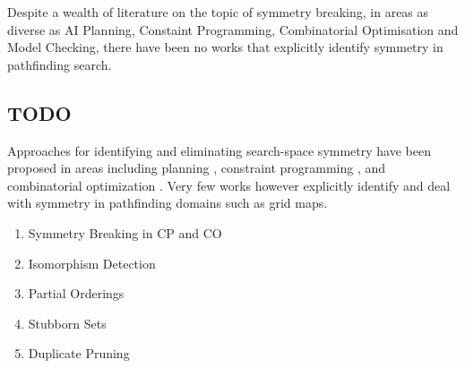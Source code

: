 Despite a wealth of literature on the topic of symmetry breaking, in areas
as diverse as AI Planning, Constaint Programming, Combinatorial Optimisation
and Model Checking, there have been no works that explicitly identify symmetry 
in pathfinding search.

\subsection{TODO}
Approaches for identifying and eliminating search-space symmetry have been
proposed in areas including planning \cite{fox99}, constraint programming
\cite{gent00}, and combinatorial optimization \cite{fukunaga08}. 
Very few works however explicitly identify and deal with symmetry in pathfinding
domains such as grid maps. 

\begin{enumerate}
\item{Symmetry Breaking in CP and CO}
\item{Isomorphism Detection}
\item{Partial Orderings}
\item{Stubborn Sets}
\item{Duplicate Pruning}
\end{enumerate}

